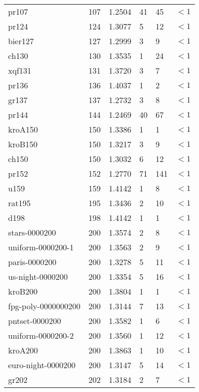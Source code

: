 \begin{longtable}{|lrrlll|}
pr107 & 107 & \num{1.2504} & \num{41} & \num{45} & $<1$ \\
pr124 & 124 & \num{1.3077} & \num{5} & \num{12} & $<1$ \\
bier127 & 127 & \num{1.2999} & \num{3} & \num{9} & $<1$ \\
ch130 & 130 & \num{1.3535} & \num{1} & \num{24} & $<1$ \\
xqf131 & 131 & \num{1.3720} & \num{3} & \num{7} & $<1$ \\
pr136 & 136 & \num{1.4037} & \num{1} & \num{2} & $<1$ \\
gr137 & 137 & \num{1.2732} & \num{3} & \num{8} & $<1$ \\
pr144 & 144 & \num{1.2469} & \num{40} & \num{67} & $<1$ \\
kroA150 & 150 & \num{1.3386} & \num{1} & \num{1} & $<1$ \\
kroB150 & 150 & \num{1.3217} & \num{3} & \num{9} & $<1$ \\
ch150 & 150 & \num{1.3032} & \num{6} & \num{12} & $<1$ \\
pr152 & 152 & \num{1.2770} & \num{71} & \num{141} & $<1$ \\
u159 & 159 & \num{1.4142} & \num{1} & \num{8} & $<1$ \\
rat195 & 195 & \num{1.3436} & \num{2} & \num{10} & $<1$ \\
d198 & 198 & \num{1.4142} & \num{1} & \num{1} & $<1$ \\
stars-0000200 & 200 & \num{1.3574} & \num{2} & \num{8} & $<1$ \\
uniform-0000200-1 & 200 & \num{1.3563} & \num{2} & \num{9} & $<1$ \\
paris-0000200 & 200 & \num{1.3278} & \num{5} & \num{11} & $<1$ \\
us-night-0000200 & 200 & \num{1.3354} & \num{5} & \num{16} & $<1$ \\
kroB200 & 200 & \num{1.3804} & \num{1} & \num{1} & $<1$ \\
fpg-poly-0000000200 & 200 & \num{1.3144} & \num{7} & \num{13} & $<1$ \\
pntset-0000200 & 200 & \num{1.3582} & \num{1} & \num{6} & $<1$ \\
uniform-0000200-2 & 200 & \num{1.3560} & \num{1} & \num{12} & $<1$ \\
kroA200 & 200 & \num{1.3863} & \num{1} & \num{10} & $<1$ \\
euro-night-0000200 & 200 & \num{1.3147} & \num{5} & \num{14} & $<1$ \\
gr202 & 202 & \num{1.3184} & \num{2} & \num{7} & $<1$ \\

\end{longtable}
